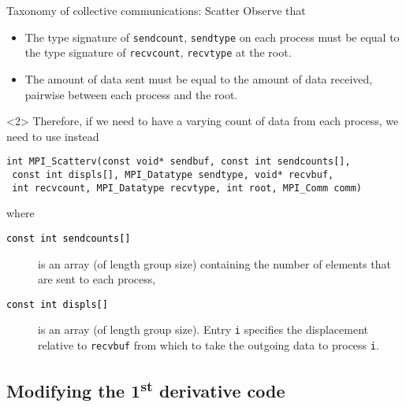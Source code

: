 \documentclass[xcolor={svgnames,usenames}]{beamer}
\begin{document}
\begin{frame}[fragile]{Taxonomy of collective communications: Scatter}
\small
Observe that
\begin{itemize}
	\item The type signature of \texttt{sendcount}, \texttt{sendtype} on each process must be equal to the type signature of \texttt{recvcount}, \texttt{recvtype} at the root. 
	\item The amount of data sent must be equal to the amount of data received, pairwise between each process and the root.
\end{itemize}
\begin{onlyenv}<2>
	Therefore, if we need to have a varying count of data from each process, we need to use instead 
\begin{verbatim}
int MPI_Scatterv(const void* sendbuf, const int sendcounts[],
 const int displs[], MPI_Datatype sendtype, void* recvbuf,
 int recvcount, MPI_Datatype recvtype, int root, MPI_Comm comm)
\end{verbatim}
	where
	\begin{description}
		\item[\textcolor{black}{\texttt{const int sendcounts[]}}] is an array (of length group size) containing the number of elements that are sent to each process,
		\item[\textcolor{black}{\texttt{const int displs[]}}] is an array (of length group size). Entry \texttt{i} specifies
		the displacement relative to \texttt{recvbuf} from which to take the outgoing data to process \texttt{i}.
	\end{description}
\end{onlyenv}
\end{frame}


\subsection{Modifying the 1\textsuperscript{st} derivative code}
\end{document}
